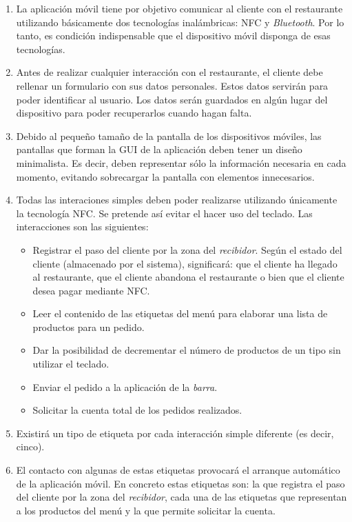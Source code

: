 \begin{enumerate}
\item La aplicación móvil tiene por objetivo comunicar al cliente con el
restaurante utilizando básicamente dos tecnologías inalámbricas: \acs{NFC} y
\emph{Bluetooth}. Por lo tanto, es condición indispensable que el dispositivo
móvil disponga de esas tecnologías.
\item Antes de realizar cualquier interacción con el restaurante, el cliente
debe rellenar un formulario con sus datos personales. Estos datos servirán para 
poder identificar al usuario. Los datos serán guardados en algún lugar del
dispositivo para poder recuperarlos cuando hagan falta.
\item Debido al pequeño tamaño de la pantalla de los dispositivos móviles, las 
pantallas que forman la \acs{GUI} de la aplicación deben tener un diseño 
minimalista. Es decir, deben representar sólo la información necesaria en cada
momento, evitando sobrecargar la pantalla con elementos innecesarios.
\item Todas las interaciones simples deben poder realizarse utilizando
únicamente la tecnología \acs{NFC}. Se pretende así evitar el hacer uso del
teclado. Las interacciones son las siguientes:
  \begin{itemize}
  \item Registrar el paso del cliente por la zona del \emph{recibidor}.
  Según el estado del cliente (almacenado por el sistema), significará: que
  el cliente ha llegado al restaurante, que el cliente abandona el restaurante
  o bien que el cliente desea pagar mediante \acs{NFC}.
  \item Leer el contenido de las etiquetas del menú para elaborar una lista
  de productos para un pedido.
  \item Dar la posibilidad de decrementar el número de productos de un tipo
  sin utilizar el teclado.
  \item Enviar el pedido a la aplicación de la \emph{barra}.
  \item Solicitar la cuenta total de los pedidos realizados.
  \end{itemize}
\item Existirá un tipo de etiqueta por cada interacción simple diferente
(es decir, cinco).
\item El contacto con algunas de estas etiquetas provocará el arranque
automático de la aplicación móvil. En concreto estas etiquetas son: la que
registra el paso del cliente por la zona del \emph{recibidor}, cada una de las
etiquetas que representan a los productos del menú y la que permite solicitar
la cuenta.
\end{enumerate}

